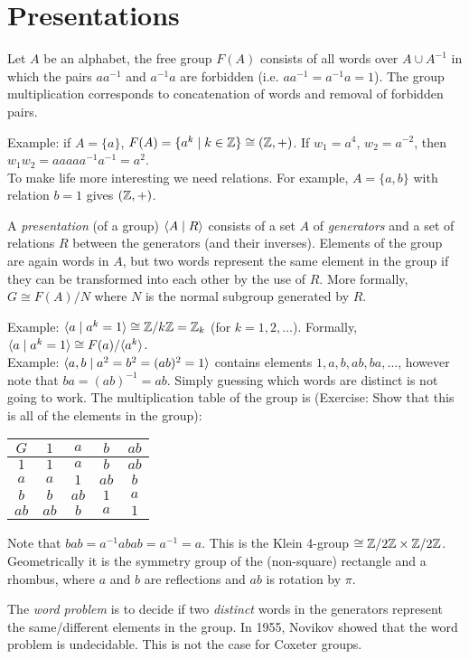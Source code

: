 \section{Presentations}

Let $A$ be an alphabet, the free group $F(A)$ consists of all words over $A
\cup A^{-1}$ in which the pairs $aa^{-1}$ and $a^{-1}a$ are forbidden (i.e.
$aa^{-1}=a^{-1}a=1$). The group multiplication corresponds to concatenation of
words and removal of forbidden pairs.

Example: if $A = \{a\}$, $F(A) = \{a^k \mid k \in \mathbb{Z}\} \cong (\mathbb{Z},+)$.
If $w_1 = a^4$, $w_2 = a^{-2}$, then $w_1 w_2 = a a a a a^{-1} a^{-1} = a^2$.
\\

To make life more interesting we need relations.
For example, $A = \{a, b\}$ with relation $b=1$ gives $(\mathbb{Z}, +)$.

A {\em presentation} (of a group) $\langle A \mid R \rangle$ consists of
a set $A$ of {\em generators} and a set of relations $R$ between the generators
(and their inverses). Elements of the group are again words in $A$, but two
words represent the same element in the group if they can be transformed into
each other by the use of $R$. More formally, $G \cong F(A)/N$ where $N$ is the
normal subgroup generated by $R$.

Example: $\langle a \mid a^k = 1 \rangle \cong \mathbb{Z}/k\mathbb{Z} = \mathbb{Z}_k$
(for $k = 1, 2, \dots$). Formally, $\langle a \mid a^k = 1 \rangle \cong F(a)/\langle a^k \rangle$.
\\

Example: $\langle a,b \mid a^2 = b^2 = (ab)^2 = 1 \rangle$ contains elements
$1, a, b, ab, ba, \dots$, however note that $ba = (ab)^{-1} = ab$.
Simply guessing which words are distinct is not going to work.
The multiplication table of the group is (Exercise: Show that this is all of
the elements in the group):

\begin{tabular}{c||c|c|c|c}
$G$ & $1$ & $a$ & $b$ & $ab$ \\
\hline
\hline
$1$ & $1$ & $a$ & $b$ & $ab$ \\ \hline
$a$ & $a$ & $1$ & $ab$ & $b$ \\ \hline
$b$ & $b$ & $ab$ & $1$ & $a$ \\ \hline
$ab$ & $ab$ & $b$ & $a$ & $1$
\end{tabular}

Note that $bab = a^{-1}abab = a^{-1} = a$. This is the Klein 4-group
$\cong \mathbb{Z}/2\mathbb{Z} \times \mathbb{Z}/2\mathbb{Z}$. Geometrically it is the symmetry group of the
(non-square) rectangle and a rhombus,
where $a$ and $b$ are reflections and $ab$ is rotation by $\pi$.

The {\em word problem} is to decide if two {\em distinct} words in the
generators represent the same/different elements in the group.
In 1955, Novikov showed that the word problem is undecidable. This is not the
case for Coxeter groups.

